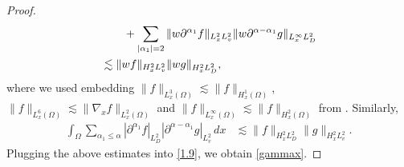 \documentclass[reqno,a4paper]{amsart}
\numberwithin{equation}{section}
\newcommand{\1}{\mathbf{1}}
\newcommand{\na}{\nabla}
\newcommand{\<}{\langle}
\renewcommand{\>}{\rangle}
\begin{document}
\begin{proof}
\begin{align*}
		&\notag\qquad+\sum_{|\alpha_1|=2}\|w{\partial^{\alpha_1} f}\|_{L^2_xL^2_v}\|w{\partial^{\alpha-\alpha_1} g}\|_{L^\infty_xL^2_{D}}\\
		&\lesssim \|{wf}\|_{H^2_xL^2_v}\|{wg}\|_{H^2_xL^2_{D}},
	\end{align*}
where we used embedding
 $\|f\|_{L^3_x(\Omega)}\lesssim\|f\|_{H^1_x(\Omega)}$, $\|f\|_{L^6_x(\Omega)}\lesssim\|\na_xf\|_{L^2_x(\Omega)}$ and $\|f\|_{L^\infty_x(\Omega)}\lesssim\|f\|_{H^2_x(\Omega)}$ from \cite[Section V and (V.21)]{Adams2003}. 
  Similarly, 
\begin{align*}
\int_{\Omega}\sum_{\alpha_1\le\alpha}|{\partial^{\alpha_1} f}|_{L^2_D}|{\partial^{\alpha-\alpha_1} g}|_{L^2_{v}}\,dx
&\lesssim \|{f}\|_{H^2_xL^2_D}\|{g}\|_{H^2_xL^2_{v}}.
\end{align*}
Plugging the above estimates into \eqref{1.9}, we obtain \eqref{gammax}. 	
\end{proof}
\end{document}
